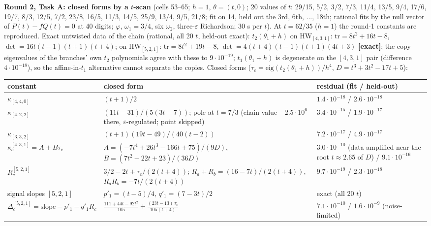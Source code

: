 \documentclass[10pt]{article}
\begin{document}
\textbf{Round 2, Task A: closed forms by a $t$-scan} (cells 53--65; $h=1$, $\theta=(t,0)$; 20 values of $t$: 29/15, 5/2, 3/2, 7/3, 11/4, 13/5, 9/4, 17/6, 19/7, 8/3, 12/5, 7/2, 23/8, 16/5, 11/3, 14/5, 25/9, 13/4, 9/5, 21/8; fit on 14, held out the 3rd, 6th, ..., 18th; rational fits by the null vector of $P(t)-fQ(t)=0$ at 40 digits; $\varphi$, $\omega_1=3/4$, six $\omega_2$, three-$\varepsilon$ Richardson; 30 s per $t$). At $t=62/35$ ($h=1$) the round-1 constants are reproduced. Exact untwisted data of the chain (rational, all 20 $t$, held-out exact): $t_2(\theta_1+h)$ on $\mathrm{HW}_{[4,3,1]}$: $\mathrm{tr}=8t^2+16t-8$, $\det=16t(t-1)(t+1)(t+4)$; on $\mathrm{HW}_{[5,2,1]}$: $\mathrm{tr}=8t^2+19t-8$, $\det=4(t+4)(t-1)(t+1)(4t+3)$ \textbf{[exact]}; the copy eigenvalues of the branches' own $t_2$ polynomials agree with these to $9\cdot10^{-19}$; $t_1(\theta_1+h)$ is degenerate on the $[4,3,1]$ pair (difference $4\cdot10^{-18}$), so the affine-in-$t_1$ alternative cannot separate the copies. Closed forms ($\tau_c=\mathrm{eig}(t_2(\theta_1+h))/h^4$, $D=t^3+3t^2-17t+5$):

\begin{center}\small\setlength{\tabcolsep}{3pt}\begin{longtable}{@{}p{3.2cm}p{6.4cm}p{3.6cm}@{}}\toprule
\textbf{constant} & \textbf{closed form} & \textbf{residual (fit / held-out)} \\\midrule\endhead
$\kappa_{[4,4,0]}$ & $(t+1)/2$ & $1.4\cdot10^{-18}$ / $2.6\cdot10^{-18}$ \\
$\kappa_{[4,2,2]}$ & $(11t-31)/(5(3t-7))$; pole at $t=7/3$ (chain value $-2.5\cdot10^6$ there, $\varepsilon$-regulated; point skipped) & $3.4\cdot10^{-15}$ / $1.9\cdot10^{-17}$ \\
$\kappa_{[3,3,2]}$ & $(t+1)(19t-49)/(40(t-2))$ & $7.2\cdot10^{-17}$ / $4.9\cdot10^{-17}$ \\
$\kappa_c^{[4,3,1]}=A+B\tau_c$ & $A=(-7t^4+26t^3-166t+75)/(9D)$, $B=(7t^2-22t+23)/(36D)$ & $3.0\cdot10^{-10}$ (data amplified near the root $t\approx2.65$ of $D$) / $9.1\cdot10^{-16}$ \\
$R_c^{[5,2,1]}$ & $3/2-2t+\tau_c/(2(t+4))$; $R_a+R_b=(16-7t)/(2(t+4))$, $R_aR_b=-7t/(2(t+4))$ & $9.7\cdot10^{-19}$ / $2.3\cdot10^{-18}$ \\
signal slopes $[5,2,1]$ & $p'_1=(t-5)/4$, $q'_1=(7-3t)/2$ & exact (all 20 $t$) \\
$\Delta_c^{[5,2,1]}=\mathrm{slope}-p'_1-q'_1R_c$ & $\frac{111+44t-92t^2}{105}+\frac{(23t-13)\,\tau_c}{105(t+4)}$ & $7.1\cdot10^{-10}$ / $1.6\cdot10^{-9}$ (noise-limited) \\
\bottomrule\end{longtable}\end{center}
\end{document}
